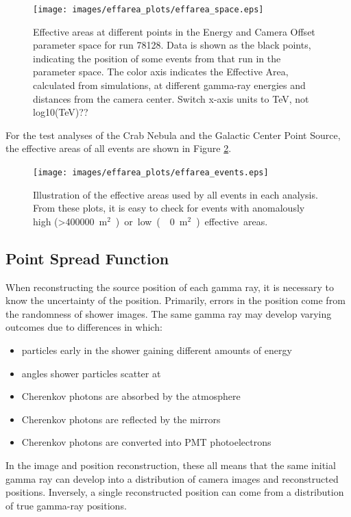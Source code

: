     \begin{figure}[ht]
      \centering
      \texttt{[image: images/effarea\_plots/effarea\_space.eps]}
      \caption[Effective Area Parameter Space]{
        Effective areas at different points in the Energy and Camera Offset parameter space for run 78128.
        Data is shown as the black points, indicating the position of some events from that run in the parameter space.
        The color axis indicates the Effective Area, calculated from simulations, at different gamma-ray energies and distances from the camera center.
        {\color{red}Switch x-axis units to TeV, not log10(TeV)??}
      }
      \label{fig:effarea_paramspace}
    \end{figure}

    For the test analyses of the Crab Nebula and the Galactic Center Point Source, the effective areas of all events are shown in Figure \ref{fig:effarea_usage}.

    \begin{figure}[ht]
      \centering
      \texttt{[image: images/effarea\_plots/effarea\_events.eps]}
      \caption[Effective Areas Used]{
      Illustration of the effective areas used by all events in each analysis.
      From these plots, it is easy to check for events with anomalously high (>\SI{400000}{m${}^2$}) or low (\nicetilde\SI{0}{m${}^2$}) effective areas.
      }
      \label{fig:effarea_usage}
    \end{figure}
  
  \FloatBarrier

  \subsection{Point Spread Function}\label{subsec:psf}

    When reconstructing the source position of each gamma ray, it is necessary to know the uncertainty of the position.
    Primarily, errors in the position come from the randomness of shower images.
    The same gamma ray may develop varying outcomes due to differences in which:
    \begin{itemize}[label=$\bullet$]
      \item particles early in the shower gaining different amounts of energy
      \item angles shower particles scatter at
      \item Cherenkov photons are absorbed by the atmosphere
      \item Cherenkov photons are reflected by the mirrors
      \item Cherenkov photons are converted into PMT photoelectrons
    \end{itemize}
    In the image and position reconstruction, these all means that the same initial gamma ray can develop into a distribution of camera images and reconstructed positions.
    Inversely, a single reconstructed position can come from a distribution of true gamma-ray positions.

